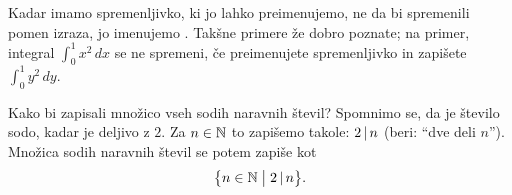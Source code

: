 Kadar imamo spremenljivko, ki jo lahko preimenujemo, ne da bi spremenili pomen izraza, jo imenujemo . Takšne primere že dobro poznate; na primer, integral $\int_0^1 x^2 \,dx$ se ne spremeni, če preimenujete spremenljivko in zapišete $\int_0^1 y^2 \,dy$.

\begin{zgled}
Kako bi zapisali množico vseh sodih naravnih števil? Spomnimo se, da je število sodo, kadar je deljivo z $2$. Za $n \in \mathbb{N}$ to zapišemo takole: $2 \,|\, n$ (beri: ``dve deli $n$''). Množica sodih naravnih števil se potem zapiše kot
\[\set[1]{n \in \NN}{2 \divides n}.\]
\end{zgled}

